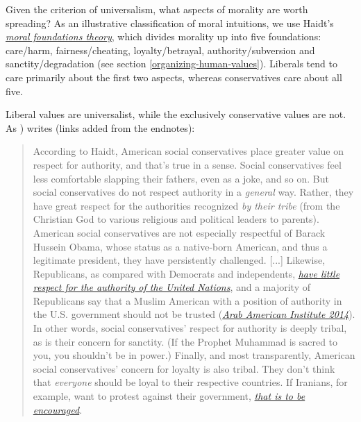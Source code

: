 Given the criterion of universalism, what aspects of morality are worth
spreading? As an illustrative classification of moral intuitions, we use
Haidt's
\href{https://en.wikipedia.org/wiki/Moral_foundations_theory}{\emph{moral
foundations theory}}, which divides morality up into five foundations:
care/harm, fairness/cheating, loyalty/betrayal, authority/subversion and
sanctity/degradation (see section
\ref{organizing-human-values}). Liberals tend to care primarily about the first two
aspects, whereas conservatives care about all five.

Liberal values are universalist, while the exclusively conservative
values are not. As \parencite{Greene2013-sq}) writes (links
added from the endnotes):

\begin{quote}
According to Haidt, American social conservatives place greater value on
respect for authority, and that's true in a sense. Social conservatives
feel less comfortable slapping their fathers, even as a joke, and so on.
But social conservatives do not respect authority in a \emph{general}
way. Rather, they have great respect for the authorities recognized
\emph{by their tribe} (from the Christian God to various religious and
political leaders to parents). American social conservatives are not
especially respectful of Barack Hussein Obama, whose status as a
native-born American, and thus a legitimate president, they have
persistently challenged. {[}...{]} Likewise, Republicans, as compared
with Democrats and independents,
\href{http://www.pewglobal.org/2009/09/21/obama-addresses-more-popular-un/}{\emph{have
little respect for the authority of the United Nations}}, and a majority
of Republicans say that a Muslim American with a position of authority
in the U.S. government should not be trusted
(\href{http://b.3cdn.net/aai/3e05a493869e6b44b0_76m6iyjon.pdf}{\emph{Arab
American Institute 2014}}). In other words, social conservatives'
respect for authority is deeply tribal, as is their concern for
sanctity. (If the Prophet Muhammad is sacred to you, you shouldn't be in
power.) Finally, and most transparently, American social conservatives'
concern for loyalty is also tribal. They don't think that
\emph{everyone} should be loyal to their respective countries. If
Iranians, for example, want to protest against their government,
\href{http://www.cbsnews.com/news/gop-hits-obama-for-silence-on-iran-protests/}{\emph{that
is to be encouraged}}.
\end{quote}

